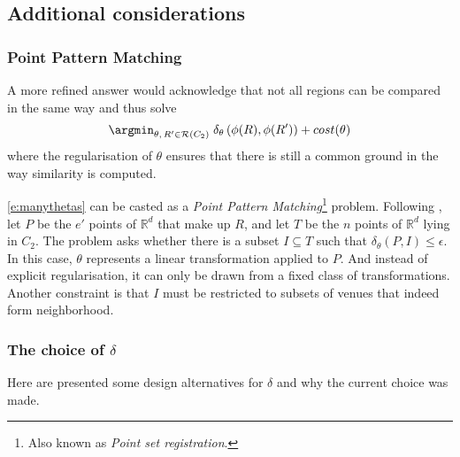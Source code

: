 \subsection*{Additional considerations}
\subsubsection*{Point Pattern Matching}

A more refined answer would acknowledge that not all regions can be compared in
the same way and thus solve
\begin{equation}
    \argmin_{\theta ,\, R' \in \mathcal{R}(C_2)}\; \delta_{\theta}
    \left(\phi(R), \phi(R')\right) + cost(\theta)
    \label{e:manythetas}
\end{equation}
where the regularisation of $\theta$ ensures that there is still a common
ground in the way similarity is computed.

\eqref{e:manythetas} can be casted as a \emph{Point Pattern
Matching}\footnote{Also known as \emph{Point set registration}.} problem.
Following \textcite{PointPatternMatching08}, let $P$ be the $e'$ points of
$\mathbb{R}^d$ that make up $R$, and let $T$ be the $n$ points of
$\mathbb{R}^d$ lying in $C_2$. The problem asks whether there is a subset $I
\subseteq T$ such that $\delta_{\theta}\left(P, I\right) \leq \epsilon$. In
this case, $\theta$ represents a linear transformation applied to $P$. And
instead of explicit regularisation, it can only be drawn from a fixed class of
transformations. Another constraint is that $I$ must be restricted to subsets
of venues that indeed form neighborhood.

\subsubsection*{The choice of $\delta$}

Here are presented some design alternatives for $\delta$ and why the current
choice was made.

